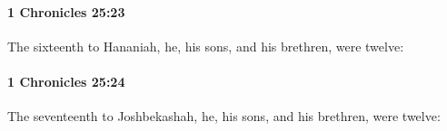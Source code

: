 		\paragraph{1 Chronicles 25:23} %
			\label{1CHRONICLES-25-23}

			The sixteenth to Hananiah, he, his sons, and his brethren, were twelve:


		\paragraph{1 Chronicles 25:24} %
			\label{1CHRONICLES-25-24}

			The seventeenth to Joshbekashah, he, his sons, and his brethren, were twelve:


